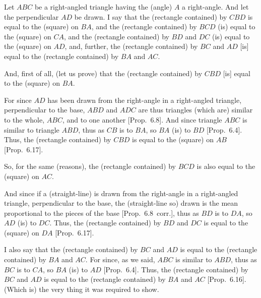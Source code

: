 \begin{Parallel}{}{}
{Let $ABC$ be a right-angled triangle having
the (angle) $A$ a right-angle. And let the perpendicular $AD$ be
drawn. I say that the (rectangle contained) by $CBD$ is equal to the
(square) on $BA$, and the (rectangle contained) by $BCD$ (is)
equal to the (square) on $CA$, and the (rectangle contained) by
$BD$ and $DC$ (is) equal to the (square) on $AD$, and, further, the
(rectangle contained) by $BC$ and $AD$ [is] equal to the (rectangle
contained) by $BA$ and $AC$.

And, first of all, (let us prove) that the (rectangle contained) by
$CBD$ [is] equal to the (square) on $BA$.

\epsfysize=2in
\centerline{}

For since $AD$ has been drawn from the right-angle  in a right-angled triangle,
perpendicular to the base, $ABD$ and $ADC$ are thus
triangles (which are) similar to the whole, $ABC$, and to one another
[Prop.~6.8]. And since triangle $ABC$ is
similar to triangle $ABD$, thus as $CB$ is to $BA$, so $BA$ (is)
to $BD$ [Prop.~6.4]. Thus, the
(rectangle contained) by $CBD$ is equal to the (square) on $AB$
[Prop.~6.17].

So, for the same (reasons), the (rectangle contained) by $BCD$
is also equal to the (square) on $AC$.

And since if a (straight-line) is drawn from the right-angle in a right-angled
triangle,  perpendicular to the base, the (straight-line so) drawn
is the mean proportional to the pieces of the base [Prop.~6.8~corr.], thus as $BD$ is to $DA$, so $AD$ (is) to $DC$. Thus, the (rectangle contained) by
$BD$ and $DC$ is equal to the (square) on $DA$ [Prop.~6.17]. 

I also say that the (rectangle contained) by $BC$ and
$AD$ is equal to the (rectangle contained) by $BA$ and $AC$.
For since,  as we said, $ABC$ is similar to $ABD$, thus as $BC$
is to $CA$, so $BA$ (is) to $AD$ [Prop.~6.4].
Thus, the (rectangle contained) by $BC$ and $AD$
is equal to the (rectangle contained) by $BA$ and $AC$ [Prop.~6.16].
(Which is) the very thing it was required to show.}
\end{Parallel}

